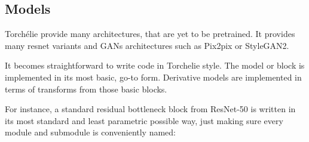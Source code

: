 \subsection{Models}

Torchélie provide many architectures, that are yet to be pretrained. It provides many resnet variants and GANs architectures such as Pix2pix or StyleGAN2.

It becomes straightforward to write code in Torchelie style. The model or block is implemented in its most basic, go-to form. Derivative models are implemented in terms of transforms from those basic blocks.

For instance, a standard residual bottleneck block from ResNet-50 is written in its most standard and least parametric possible way, just making sure every module and submodule is conveniently named:

